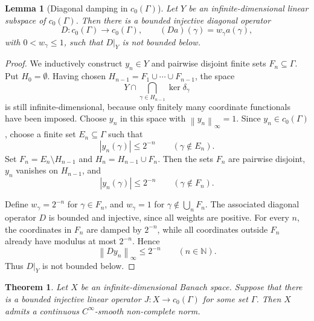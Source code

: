 \documentclass[11pt]{article}
\newtheorem{theorem}{Theorem}
\newtheorem{lemma}{Lemma}
\theoremstyle{definition}
\newcommand{\N}{\mathbb{N}}
\newcommand{\norm}[1]{\left\lVert #1 \right\rVert}
\begin{document}
\begin{lemma}[Diagonal damping in \(c_0(\Gamma)\)]
\label{lem:diagonal}
Let \(Y\) be an infinite-dimensional linear subspace of \(c_0(\Gamma)\).  Then
there is a bounded injective diagonal operator
\[
    D:c_0(\Gamma)\longrightarrow c_0(\Gamma), \qquad (Da)(\gamma)=w_\gamma a(\gamma),
\]
with \(0<w_\gamma\leq 1\), such that \(D|_Y\) is not bounded below.
\end{lemma}

\begin{proof}
We inductively construct \(y_n\in Y\) and pairwise disjoint finite sets
\(F_n\subseteq\Gamma\).  Put \(H_0=\emptyset\).  Having chosen
\(H_{n-1}=F_1\cup\cdots\cup F_{n-1}\), the space
\[
    Y\cap \bigcap_{\gamma\in H_{n-1}}\ker \delta_\gamma
\]
is still infinite-dimensional, because only finitely many coordinate
functionals have been imposed.  Choose \(y_n\) in this space with
\(\norm{y_n}_\infty=1\).  Since \(y_n\in c_0(\Gamma)\), choose a finite
set \(E_n\subseteq\Gamma\) such that
\[
    |y_n(\gamma)|\leq 2^{-n}\qquad(\gamma\notin E_n).
\]
Set \(F_n=E_n\setminus H_{n-1}\) and \(H_n=H_{n-1}\cup F_n\).  Then the
sets \(F_n\) are pairwise disjoint, \(y_n\) vanishes on \(H_{n-1}\), and
\[
    |y_n(\gamma)|\leq 2^{-n}\qquad(\gamma\notin F_n).
\]

Define \(w_\gamma=2^{-n}\) for \(\gamma\in F_n\), and \(w_\gamma=1\) for
\(\gamma\notin\bigcup_n F_n\).  The associated diagonal operator \(D\) is
bounded and injective, since all weights are positive.  For every \(n\),
the coordinates in \(F_n\) are damped by \(2^{-n}\), while all coordinates
outside \(F_n\) already have modulus at most \(2^{-n}\).  Hence
\[
    \norm{Dy_n}_\infty\leq 2^{-n}\qquad(n\in\N).
\]
Thus \(D|_Y\) is not bounded below.
\end{proof}

\begin{theorem}
\label{thm:c0}
Let \(X\) be an infinite-dimensional Banach space.  Suppose that there is a
bounded injective linear operator \(J:X\to c_0(\Gamma)\) for some set
\(\Gamma\).  Then \(X\) admits a continuous \(C^\infty\)-smooth non-complete
norm.
\end{theorem}
\end{document}

